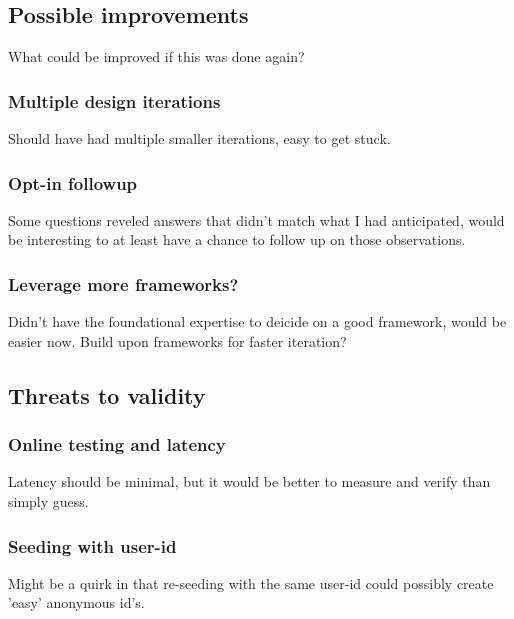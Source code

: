 \documentclass[nofilelist,dvipsnames]{cslthse-msc}
\begin{document}
			\subsection{Possible improvements}

        What could be improved if this was done again?

        \subsubsection{Multiple design iterations}

          Should have had multiple smaller iterations, easy to get stuck.

        \subsubsection{Opt-in followup}

          Some questions reveled answers that didn't match what I had
          anticipated, would be interesting to at least have a chance to follow
          up on those observations.

        \subsubsection{Leverage more frameworks?}

          Didn't have the foundational expertise to deicide on a good
          framework, would be easier now.
          Build upon frameworks for faster iteration?

			\subsection{Threats to validity}

        \subsubsection{Online testing and latency}

          Latency should be minimal, but it would be better to measure and
          verify than simply guess.

        \subsubsection{Seeding with user-id}

          Might be a quirk in that re-seeding with the same user-id could
          possibly create 'easy' anonymous id's.
\end{document}
